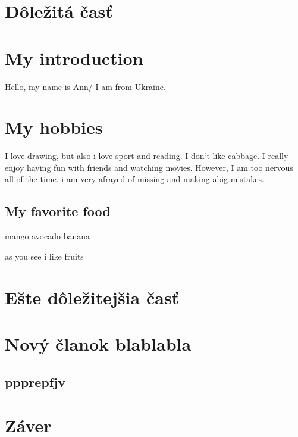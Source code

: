 \documentclass[10pt,twoside,english,a4paper]{article}
\begin{document}
\section{Dôležitá časť} \label{dolezita}


\section*{My introduction}
Hello, my name is Ann/ I am from Ukraine.
\section*{My hobbies}




I love drawing, but also i love sport and reading.
I don`t like cabbage. I  really enjoy having fun with friends and watching movies. However, I am too nervous all of the time. i am very afrayed of missing and making  abig mistakes.
\subsection{My favorite food}
mango
avocado
banana

as you see i like fruits
\section{Ešte dôležitejšia časť} \label{dolezitejsia}


\section{Nový članok blablabla}
\subsection{ppprepfjv}



\section{Záver} \label{zaver} %






\end{document}
